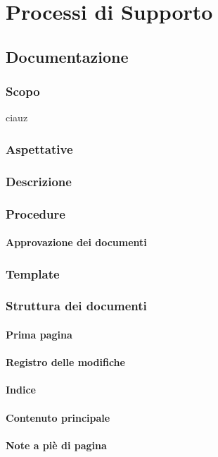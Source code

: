 \section{Processi di Supporto}


\subsection{Documentazione}

	\subsubsection{Scopo} ciauz
	\subsubsection{Aspettative}
	\subsubsection{Descrizione}
	\subsubsection{Procedure}
		\paragraph{Approvazione dei documenti}
	\subsubsection{Template}
	\subsubsection{Struttura dei documenti}
		\paragraph{Prima pagina}
		\paragraph{Registro delle modifiche}
		\paragraph{Indice}
		\paragraph{Contenuto principale}
		\paragraph{Note a piè di pagina}
